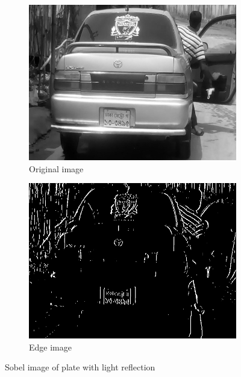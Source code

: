 \begin{figure}
\begin{subfigure}{0.5\textwidth}
    \centering
    \includegraphics[width=0.9\linewidth]{./img/experiment/stage.2/light}
    \caption{Original image}
\end{subfigure}
\begin{subfigure}{0.5\textwidth}
    \centering
    \includegraphics[width=0.9\linewidth]{./img/experiment/stage.3/light}
    \caption{Edge image}
\end{subfigure}
\caption{Sobel image of plate with light reflection}
\label{fig:MatchedResult3}
\end{figure}
